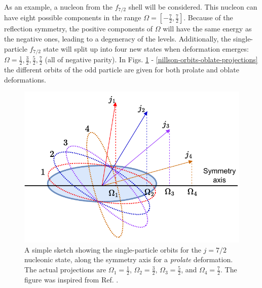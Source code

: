 As an example, a nucleon from the $f_{7/2}$ shell will be considered. This nucleon can have eight possible components in the range $\Omega=[-\frac{7}{2},\frac{7}{2}]$. Because of the reflection symmetry, the positive components of $\Omega$ will have the same energy as the negative ones, leading to a degeneracy of the levels. Additionally, the single-particle $f_{7/2}$ state will split up into four new states when deformation emerges: $\Omega=\frac{1}{2},\frac{3}{2},\frac{5}{2},\frac{7}{2}$ (all of negative parity). In Figs. \ref{nillson-orbits-prolate-projections} - \ref{nillson-orbits-oblate-projections} the different orbits of the odd particle are given for both prolate and oblate deformations.
\begin{figure}
    \centering
    \includegraphics[scale=1]{Chapters/Figures/nillson_SP_orbits.pdf}
    \caption{A simple sketch showing the single-particle orbits for the $j=7/2$ nucleonic state, along the symmetry axis for a \emph{prolate} deformation. The actual projections are $\Omega_1=\frac{1}{2}$, $\Omega_2=\frac{3}{2}$, $\Omega_3=\frac{5}{2}$, and $\Omega_4=\frac{7}{2}$. The figure was inspired from Ref. \cite{krane1991introductory}.}
    \label{nillson-orbits-prolate-projections}
\end{figure}
